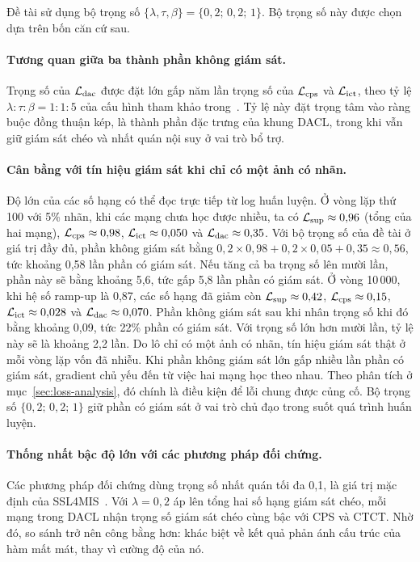Đề tài sử dụng bộ trọng số $\{\lambda,\tau,\beta\}=\{0{,}2;\,0{,}2;\,1\}$. Bộ trọng số này được chọn dựa trên bốn căn cứ sau.

\paragraph{Tương quan giữa ba thành phần không giám sát.} Trọng số của $\mathcal{L}_{\mathrm{dac}}$ được đặt lớn gấp năm lần trọng số của $\mathcal{L}_{\mathrm{cps}}$ và $\mathcal{L}_{\mathrm{ict}}$, theo tỷ lệ $\lambda:\tau:\beta=1:1:5$ của cấu hình tham khảo trong~\cite{wang2026dacl}. Tỷ lệ này đặt trọng tâm vào ràng buộc đồng thuận kép, là thành phần đặc trưng của khung DACL, trong khi vẫn giữ giám sát chéo và nhất quán nội suy ở vai trò bổ trợ.

\paragraph{Cân bằng với tín hiệu giám sát khi chỉ có một ảnh có nhãn.} Độ lớn của các số hạng có thể đọc trực tiếp từ log huấn luyện. Ở vòng lặp thứ 100 với 5\% nhãn, khi các mạng chưa học được nhiều, ta có $\mathcal{L}_{\mathrm{sup}}\approx0{,}96$ (tổng của hai mạng), $\mathcal{L}_{\mathrm{cps}}\approx0{,}98$, $\mathcal{L}_{\mathrm{ict}}\approx0{,}050$ và $\mathcal{L}_{\mathrm{dac}}\approx0{,}35$. Với bộ trọng số của đề tài ở giá trị đầy đủ, phần không giám sát bằng $0{,}2\times0{,}98+0{,}2\times0{,}05+0{,}35\approx0{,}56$, tức khoảng 0,58 lần phần có giám sát. Nếu tăng cả ba trọng số lên mười lần, phần này sẽ bằng khoảng 5,6, tức gấp 5,8 lần phần có giám sát. Ở vòng 10\,000, khi hệ số ramp-up là 0,87, các số hạng đã giảm còn $\mathcal{L}_{\mathrm{sup}}\approx0{,}42$, $\mathcal{L}_{\mathrm{cps}}\approx0{,}15$, $\mathcal{L}_{\mathrm{ict}}\approx0{,}028$ và $\mathcal{L}_{\mathrm{dac}}\approx0{,}070$. Phần không giám sát sau khi nhân trọng số khi đó bằng khoảng 0,09, tức 22\% phần có giám sát. Với trọng số lớn hơn mười lần, tỷ lệ này sẽ là khoảng 2,2 lần. Do lô chỉ có một ảnh có nhãn, tín hiệu giám sát thật ở mỗi vòng lặp vốn đã nhiễu. Khi phần không giám sát lớn gấp nhiều lần phần có giám sát, gradient chủ yếu đến từ việc hai mạng học theo nhau. Theo phân tích ở mục~\ref{sec:loss-analysis}, đó chính là điều kiện để lỗi chung được củng cố. Bộ trọng số $\{0{,}2;\,0{,}2;\,1\}$ giữ phần có giám sát ở vai trò chủ đạo trong suốt quá trình huấn luyện.

\paragraph{Thống nhất bậc độ lớn với các phương pháp đối chứng.} Các phương pháp đối chứng dùng trọng số nhất quán tối đa 0,1, là giá trị mặc định của SSL4MIS~\cite{luo2020ssl4mis}. Với $\lambda=0{,}2$ áp lên tổng hai số hạng giám sát chéo, mỗi mạng trong DACL nhận trọng số giám sát chéo cùng bậc với CPS và CTCT. Nhờ đó, so sánh trở nên công bằng hơn: khác biệt về kết quả phản ánh cấu trúc của hàm mất mát, thay vì cường độ của nó.

